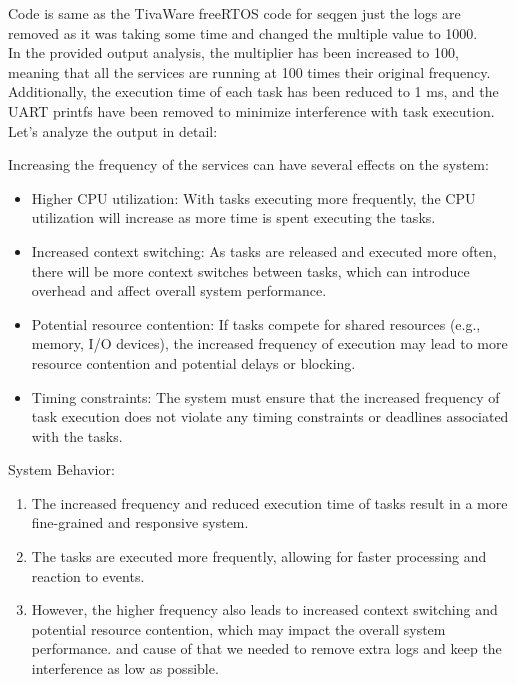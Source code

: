 \documentclass[a4paper,11pt]{article}%
\newenvironment{qanda}{\setlength{\parindent}{0pt}}{\bigskip}
\begin{document}
\begin{qanda}
\begin{enumerate}
	\end{enumerate}

	\pagebreak

	Code is same as the TivaWare freeRTOS code for seqgen just the logs are removed as it was taking some time and changed the multiple value to 1000.\\

	In the provided output analysis, the multiplier has been increased to 100, meaning that all the services are running at 100 times their original frequency. Additionally, the execution time of each task has been reduced to 1 ms, and the UART printfs have been removed to minimize interference with task execution. Let's analyze the output in detail:

	Increasing the frequency of the services can have several effects on the system:
	\begin{itemize}
		\item Higher CPU utilization: With tasks executing more frequently, the CPU utilization will increase as more time is spent executing the tasks.
		\item Increased context switching: As tasks are released and executed more often, there will be more context switches between tasks, which can introduce overhead and affect overall system performance.
		\item Potential resource contention: If tasks compete for shared resources (e.g., memory, I/O devices), the increased frequency of execution may lead to more resource contention and potential delays or blocking.
		\item Timing constraints: The system must ensure that the increased frequency of task execution does not violate any timing constraints or deadlines associated with the tasks.
	\end{itemize}


	System Behavior:
	\begin{enumerate}
		\item The increased frequency and reduced execution time of tasks result in a more fine-grained and responsive system.
		\item The tasks are executed more frequently, allowing for faster processing and reaction to events.
		\item However, the higher frequency also leads to increased context switching and potential resource contention, which may impact the overall system performance. and cause of that we needed to remove extra logs and keep the interference as low as possible.
	\end{enumerate}



\end{qanda}
\end{document}
